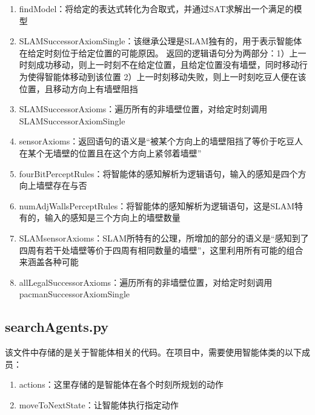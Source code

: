 \begin{enumerate}
    \item findModel：将给定的表达式转化为合取式，并通过SAT求解出一个满足的模型
    \item SLAMSuccessorAxiomSingle：该继承公理是SLAM独有的，用于表示智能体在给定时刻位于给定位置的可能原因。
    返回的逻辑语句分为两部分：1）上一时刻成功移动，则上一时刻不在给定位置，且给定位置没有墙壁，同时移动行为使得智能体移动到该位置
    2）上一时刻移动失败，则上一时刻吃豆人便在该位置，且移动方向上有墙壁阻挡
    \item SLAMSuccessorAxioms：遍历所有的非墙壁位置，对给定时刻调用SLAMSuccessorAxiomSingle
    \item sensorAxioms：返回语句的语义是“被某个方向上的墙壁阻挡了等价于吃豆人在某个无墙壁的位置且在这个方向上紧邻着墙壁”
    \item fourBitPerceptRules：将智能体的感知解析为逻辑语句，输入的感知是四个方向上墙壁存在与否
    \item numAdjWallsPerceptRules：将智能体的感知解析为逻辑语句，这是SLAM特有的，输入的感知是三个方向上的墙壁数量
    \item SLAMsensorAxioms：SLAM所特有的公理，所增加的部分的语义是“感知到了四周有若干处墙壁等价于四周有相同数量的墙壁”，这里利用所有可能的组合来涵盖各种可能
    \item allLegalSuccessorAxioms：遍历所有的非墙壁位置，对给定时刻调用pacmanSuccessorAxiomSingle
\end{enumerate}
\subsection{searchAgents.py}
该文件中存储的是关于智能体相关的代码。在项目中，需要使用智能体类的以下成员：
\begin{enumerate}
    \item actions：这里存储的是智能体在各个时刻所规划的动作
    \item moveToNextState：让智能体执行指定动作
\end{enumerate}